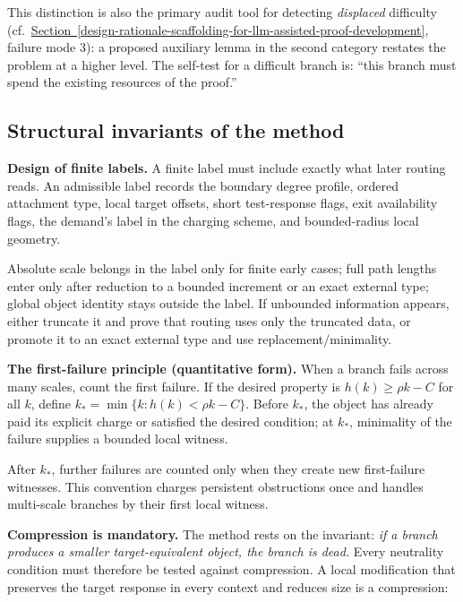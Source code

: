 \documentclass[
  11pt,
]{article}
\theoremstyle{definition}
\newcommand{\secref}[1]{\hyperref[#1]{Section~\ref*{#1}}}
\begin{document}
This distinction is also the primary audit tool for detecting
\emph{displaced} difficulty (cf.~\secref{design-rationale-scaffolding-for-llm-assisted-proof-development}, failure mode 3): a proposed
auxiliary lemma in the second category restates the problem at a higher
level. The self-test for a difficult branch is: ``this branch must spend
the existing resources of the proof.''



\subsection{Structural invariants of the
method}\label{structural-invariants-of-the-method}

\textbf{Design of finite labels.} A finite label must include exactly
what later routing reads. An admissible label records the boundary
degree profile, ordered attachment type, local target offsets, short
test-response flags, exit availability flags, the demand's label in the
charging scheme, and bounded-radius local geometry.

Absolute scale belongs in the label only for finite early cases; full
path lengths enter only after reduction to a bounded increment or an
exact external type; global object identity stays outside the label. If
unbounded information appears, either truncate it and prove that routing
uses only the truncated data, or promote it to an exact external type
and use replacement/minimality.

\textbf{The first-failure principle (quantitative form).} When a branch
fails across many scales, count the first failure. If the desired
property is \(h(k)\ge \rho k - C\) for all \(k\), define
\(k_* = \min\{k : h(k) < \rho k - C\}\). Before \(k_*\), the object has
already paid its explicit charge or satisfied the desired condition; at
\(k_*\), minimality of the failure supplies a bounded local witness.

After \(k_*\), further failures are counted only when they create new
first-failure witnesses. This convention charges persistent obstructions
once and handles multi-scale branches by their first local witness.

\textbf{Compression is mandatory.} The method rests on the invariant:
\emph{if a branch produces a smaller target-equivalent object, the
branch is dead.} Every neutrality condition must therefore be tested
against compression. A local modification that preserves the target
response in every context and reduces size is a compression:
\end{document}
